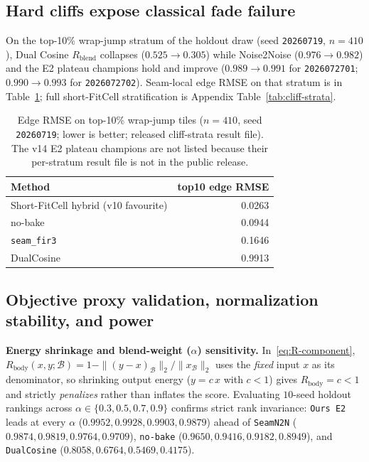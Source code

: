 \subsection{Hard cliffs expose classical fade failure}
\label{sec:cliff-strata}

On the top-10\% wrap-jump stratum of the holdout draw (seed \texttt{20260719}, $n{=}410$), Dual Cosine $R_{\mathrm{blend}}$ collapses ($0.525\to0.305$) while Noise2Noise ($0.976\to0.982$) and the E2 plateau champions hold and improve ($0.989\to0.991$ for \texttt{2026072701}; $0.990\to0.993$ for \texttt{2026072702}).
Seam-local edge RMSE on that stratum is in Table~\ref{tab:cliff-edge-rmse}; full short-FitCell stratification is Appendix Table~\ref{tab:cliff-strata}.

\begin{table}[t]
  \centering
  \caption{Edge RMSE on top-10\% wrap-jump tiles ($n{=}410$, seed \texttt{20260719}; lower is better; released cliff-strata result file). The v14 E2 plateau champions are not listed because their per-stratum result file is not in the public release.}
  \label{tab:cliff-edge-rmse}
  \setlength{\tabcolsep}{5pt}
  \begin{tabular}{@{}lr@{}}
    \toprule
    Method & top10 edge RMSE \\
    \midrule
    Short-FitCell hybrid (v10 favourite) & 0.0263 \\
    no-bake & 0.0944 \\
    \texttt{seam\_fir3} & 0.1646 \\
    DualCosine & 0.9913 \\
    \bottomrule
  \end{tabular}
\end{table}

\subsection{Objective proxy validation, normalization stability, and power}
\label{sec:proxy-and-lambda}

\textbf{Energy shrinkage and blend-weight ($\alpha$) sensitivity.}
In~\eqref{eq:R-component}, $R_{\mathrm{body}}(x,y;\mathcal{B})=1-\|(y-x)_{\mathcal{B}}\|_2/\|x_{\mathcal{B}}\|_2$ uses the \emph{fixed} input $x$ as its denominator, so shrinking output energy ($y{=}c\,x$ with $c<1$) gives $R_{\mathrm{body}}=c<1$ and strictly \emph{penalizes} rather than inflates the score.
Evaluating $10$-seed holdout rankings across $\alpha\in\{0.3,0.5,0.7,0.9\}$ confirms strict rank invariance: \texttt{Ours E2} leads at every $\alpha$ ($0.9952,0.9928,0.9903,0.9879$) ahead of \texttt{SeamN2N} ($0.9874,0.9819,0.9764,0.9709$), \texttt{no-bake} ($0.9650,0.9416,0.9182,0.8949$), and \texttt{DualCosine} ($0.8058,0.6764,0.5469,0.4175$).

